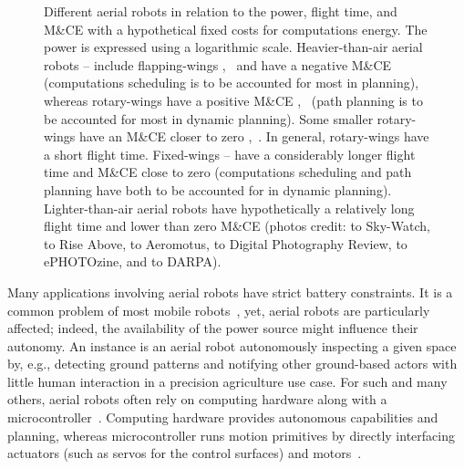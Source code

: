 \begin{figure}[p!]
  \centering
  \footnotesize{}\selectfont
  
  \vspace*{42pt}
  \caption[Different aerial robots in relation to the power, flight time, and M\&CE]{Different aerial robots in relation to the power, flight time, and M\&CE with a hypothetical fixed costs for computations energy. The power is expressed using a logarithmic scale. Heavier-than-air aerial robots -- include flapping-wings ,~ and have a negative M\&CE (computations scheduling is to be accounted for most in planning), whereas rotary-wings have a positive M\&CE ,~ (path planning is to be accounted for most in dynamic planning). Some smaller rotary-wings have an M\&CE closer to zero ,~. In general, rotary-wings have a short flight time. Fixed-wings -- have a considerably longer flight time and M\&CE close to zero (computations scheduling and path planning have both to be accounted for in dynamic planning). Lighter-than-air aerial robots  have hypothetically a relatively long flight time and lower than zero M\&CE {\scriptsize(photos credit:  to Sky-Watch,  to Rise Above,  to Aeromotus,  to Digital Photography Review,  to ePHOTOzine, and  to DARPA)}.}
  \label{fig:robots-vs-power}
\end{figure}

Many applications involving aerial robots have strict battery constraints. It is a common problem of most mobile robots~\citep{mei2006energy}, yet, aerial robots are particularly affected; indeed, the availability of the power source might influence their autonomy. An instance is an aerial robot autonomously inspecting a given space by, e.g., detecting ground patterns and notifying other ground-based actors with little human interaction in a precision agriculture use case. For such and many others, aerial robots often rely on computing hardware along with a microcontroller~\citep{dharmadhikari2020motion,william2019aerial,papachristos2015aerial,holper2017cyber}. Computing hardware provides autonomous capabilities and planning, whereas microcontroller runs motion primitives by directly interfacing actuators (such as servos for the control surfaces) and motors~\citep{mei2005case}.


